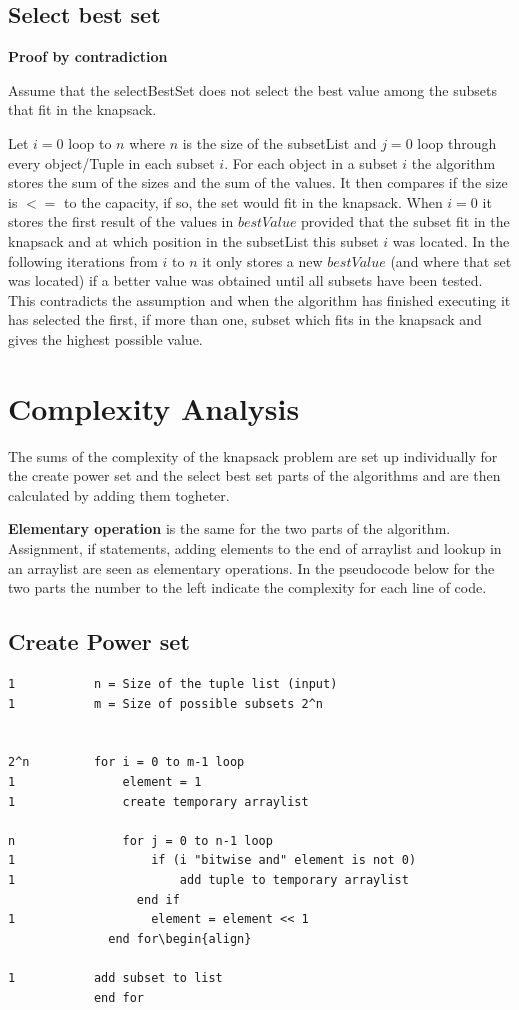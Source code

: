 \documentclass{inc/mas}
\begin{document}
\subsection{Select best set}

\textbf{Proof by contradiction}

Assume that the selectBestSet does not select the best value among the subsets that fit in the knapsack.

Let $i = 0$ loop to $n$ where $n$ is the size of the subsetList and $j = 0$ loop through every object/Tuple in each subset $i$. For each object in a subset $i$ the algorithm stores the sum of the sizes and the sum of the values. It then compares if the size is $<=$ to the capacity, if so, the set would fit in the knapsack. When $i = 0$ it stores the first result of the values in $bestValue$ provided that the subset fit in the knapsack and at which position in the subsetList this subset $i$ was located. In the following iterations from $i$ to $n$ it only stores a new $bestValue$ (and where that set was located) if a better value was obtained until all subsets have been tested. This contradicts the assumption and when the algorithm has finished executing it has selected the first, if more than one, subset which fits in the knapsack and gives the highest possible value.

\section{Complexity Analysis}

The sums of the complexity of the knapsack problem are set up individually for the create power set and the select best set parts of the algorithms and are then calculated by adding them togheter.

\textbf{Elementary operation} is the same for the two parts of the algorithm. Assignment, if statements, adding elements to the end of arraylist and lookup in an arraylist are seen as elementary operations. In the pseudocode below for the two parts the number to the left indicate the complexity for each line of code.

\subsection{Create Power set}

\begin{lstlisting}
1			n = Size of the tuple list (input)
1			m = Size of possible subsets 2^n


2^n			for i = 0 to m-1 loop	
1				element = 1	
1				create temporary arraylist
	  
n				for j = 0 to n-1 loop	
1					if (i "bitwise and" element is not 0)
1						add tuple to temporary arraylist
				  end if
1					element = element << 1
			  end for\begin{align}
	
1			add subset to list
			end for
\end{lstlisting}
\end{document}
